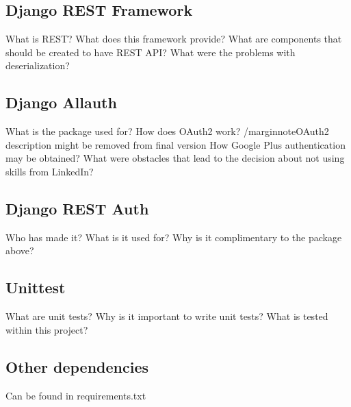 \subsection{Django REST Framework}
What is REST?
What does this framework provide?
What are components that should be created to have REST API?
What were the problems with deserialization?

\subsection{Django Allauth}
What is the package used for?
How does OAuth2 work? /marginnote{OAuth2 description might be removed from final version}
How Google Plus authentication may be obtained?
What were obstacles that lead to the decision about not using skills from LinkedIn?

\subsection{Django REST Auth}
Who has made it? What is it used for? Why is it complimentary to the package above?

\subsection{Unittest}
What are unit tests?
Why is it important to write unit tests?
What is tested within this project?

\subsection{Other dependencies}
Can be found in requirements.txt



